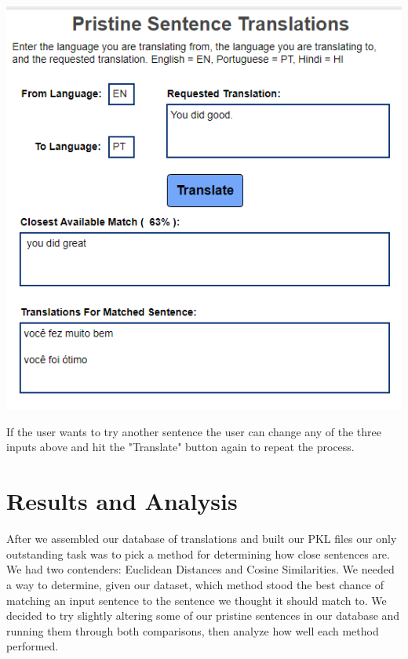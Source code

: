 \documentclass[runningheads]{llncs}
\begin{document}
	\begin{minipage}{\linewidth}
		\begin{center}
			\includegraphics[width=\linewidth]{Screen.png}
			\label{fig:Display Translations}
			\vspace*{1cm}
		\end{center}
	\end{minipage}
	\afterpage{\clearpage}
If the user wants to try another sentence the user can change any of the three inputs above and hit the "Translate" button again to repeat the process.

	\section{Results and Analysis}
	After we assembled our database of translations and built our PKL files our only outstanding task was to pick a method for determining how close sentences are. We had two contenders: Euclidean Distances and Cosine Similarities. We needed a way to determine, given our dataset, which method stood the best chance of matching an input sentence to the sentence we thought it should match to. We decided to try slightly altering some of our pristine sentences in our database and running them through both comparisons, then analyze how well each method performed.
\end{document}
